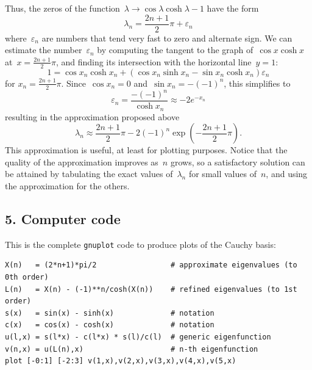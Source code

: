 Thus, the zeros of the function~$\lambda\to\cos\lambda\cosh\lambda-1$ have the
form
$$
\lambda_n = \frac{2n+1}{2}\pi + \varepsilon_n
$$
where~$\varepsilon_n$ are numbers that tend very fast to zero and alternate
sign.
We can estimate the number~$\varepsilon_n$ by computing the tangent to the
graph of~$\cos x\cosh x$ at~$x=\frac{2n+1}{2}\pi$, and finding its
intersection with the horizontal line~$y=1$:
$$
1 = \cos x_n\cosh x_n +
\left(
\cos x_n\sinh x_n - \sin x_n\cosh x_n
\right) \varepsilon_n
$$
for $x_n=\frac{2n+1}{2}\pi$.  Since~$\cos x_n=0$ and~$\sin x_n=-(-1)^n$, this
simplifies to
$$
\varepsilon_n=\frac{-(-1)^n}{\cosh x_n} \approx -2e^{-x_n}
$$
resulting in the approximation proposed above
$$
\lambda_n\approx\frac{2n+1}{2}\pi-2(-1)^n\exp\left(-\frac{2n+1}{2}\pi\right).
$$
This approximation is useful, at least for plotting purposes.
Notice that the quality of the approximation improves as~$n$ grows, so a
satisfactory solution can be attained by tabulating the exact values
of~$\lambda_n$ for small values of~$n$, and using the approximation for the
others.




\subsection{5. Computer code}
This is the complete \verb+gnuplot+ code to produce plots of the Cauchy
basis:

\begin{verbatim}
X(n)   = (2*n+1)*pi/2                 # approximate eigenvalues (to 0th order)
L(n)   = X(n) - (-1)**n/cosh(X(n))    # refined eigenvalues (to 1st order)
s(x)   = sin(x) - sinh(x)             # notation
c(x)   = cos(x) - cosh(x)             # notation
u(l,x) = s(l*x) - c(l*x) * s(l)/c(l)  # generic eigenfunction
v(n,x) = u(L(n),x)                    # n-th eigenfunction
plot [-0:1] [-2:3] v(1,x),v(2,x),v(3,x),v(4,x),v(5,x)
\end{verbatim}

